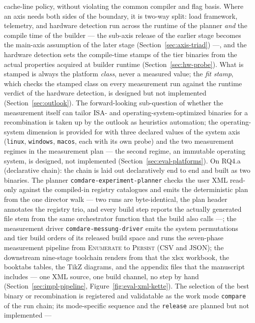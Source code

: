 \begin{nurlang}
cache-line policy, without violating the common compiler and flag basis. Where an axis needs both
sides of the boundary, it is two-way split: load framework, telemetry, and hardware detection run
across the runtime of the planner \emph{and} the compile time of the builder --- the sub-axis
release of the earlier stage becomes the main-axis assumption of the later stage
(Section~\ref{sec:axis-triad}) ---, and the hardware detection sets the compile-time stamps of the
tier binaries from the actual properties acquired at builder runtime (Section~\ref{sec:hw-probe}).
What is stamped is always the platform \emph{class}, never a measured value; the \emph{fit stamp},
which checks the stamped class on every measurement run against the runtime verdict of the
hardware detection, is designed but not implemented (Section~\ref{sec:outlook}). The
forward-looking sub-question of whether the measurement itself can tailor ISA- and
operating-system-optimized binaries for a recombination is taken up by the outlook as heuristics
automation; the operating-system dimension is provided for with three declared values of the
system axis (\texttt{linux}, \texttt{windows}, \texttt{macos}, each with its own probe) and the two
measurement regimes in the measurement plan --- the second regime, an immutable operating system,
is designed, not implemented (Section~\ref{sec:eval-platforms}). On RQ4.a (declarative chain): the
chain is laid out declaratively end to end and built as two binaries. The planner
\texttt{comdare-experiment-planner} checks the user XML read-only against the compiled-in registry
catalogues and emits the deterministic plan from the one director walk --- two runs are
byte-identical, the plan header annotates the registry trio, and every build step reports the
actually generated file stem from the same orchestrator function that the build also calls ---;
the measurement driver \texttt{comdare-messung-driver} emits the system permutations and tier
build orders of its released build space and runs the seven-phase measurement pipeline from
\textsc{Enumerate} to \textsc{Persist} (CSV and JSON); the downstream nine-stage toolchain
renders from that the xlsx workbook, the booktabs tables, the TikZ diagrams, and the appendix
files that the manuscript includes --- one XML source, one build channel, no step by hand
(Section~\ref{sec:impl-pipeline}, Figure~\ref{fig:eval-xml-kette}). The selection of the best
binary or recombination is registered and validatable as the work mode \texttt{compare} of the run
chain; its mode-specific sequence and the \texttt{release} are planned but not implemented ---

\end{nurlang}
